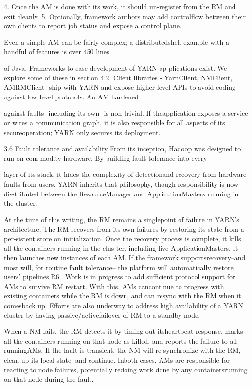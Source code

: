 4. Once the AM is done with its work, it should un-register from the RM and exit cleanly.
5. Optionally, framework authors may add controlflow between their own clients to report job status and
expose a control plane.

Even a simple AM can be fairly complex; a distributedshell example with a handful of features is over 450 lines

of Java. Frameworks to ease development of YARN ap-plications exist. We explore some of these in section 4.2.
Client libraries - YarnClient, NMClient, AMRMClient -ship with YARN and expose higher level APIs to avoid
coding against low level protocols. An AM hardened

against faults- including its own- is non-trivial. If theapplication exposes a service or wires a communication
graph, it is also responsible for all aspects of its secureoperation; YARN only secures its deployment.

3.6 Fault tolerance and availability
From its inception, Hadoop was designed to run on com-modity hardware. By building fault tolerance into every

layer of its stack, it hides the complexity of detectionand recovery from hardware faults from users. YARN inherits that philosophy, though responsibility is now dis-tributed between the ResourceManager and ApplicationMasters running in the cluster.

At the time of this writing, the RM remains a singlepoint of failure in YARN's architecture. The RM recovers from its own failures by restoring its state from a per-sistent store on initialization. Once the recovery process
is complete, it kills all the containers running in the clus-ter, including live ApplicationMasters. It then launches
new instances of each AM. If the framework supportsrecovery--and most will, for routine fault tolerance--
the platform will automatically restore users' pipelines[R6]. Work is in progress to add sufficient protocol support for AMs to survive RM restart. With this, AMs cancontinue to progress with existing containers while the
RM is down, and can resync with the RM when it comesback up. Efforts are also underway to address high
availability of a YARN cluster by having passive/activefailover of RM to a standby node.

When a NM fails, the RM detects it by timing out itsheartbeat response, marks all the containers running on
that node as killed, and reports the failure to all runningAMs. If the fault is transient, the NM will re-synchronize
with the RM, clean up its local state, and continue. Inboth cases, AMs are responsible for reacting to node failures, potentially redoing work done by any containersrunning on that node during the fault.

